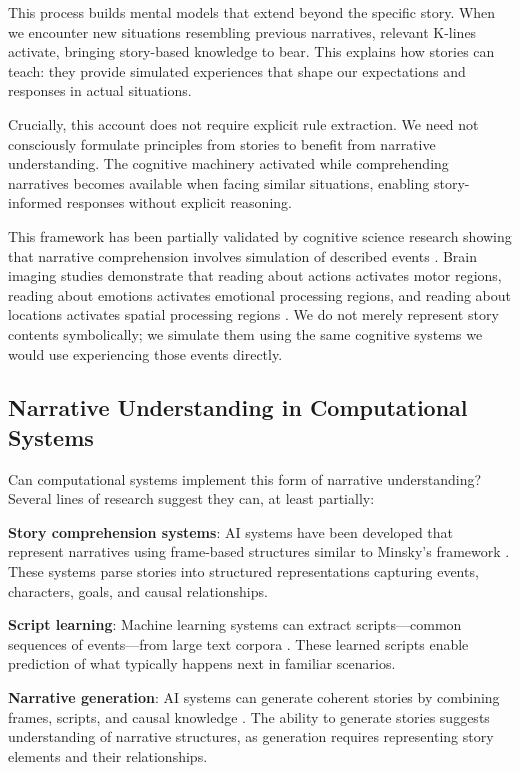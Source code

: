 \documentclass[12pt]{article}
\begin{document}
This process builds mental models that extend beyond the specific story. When we encounter new situations resembling previous narratives, relevant K-lines activate, bringing story-based knowledge to bear. This explains how stories can teach: they provide simulated experiences that shape our expectations and responses in actual situations.

Crucially, this account does not require explicit rule extraction. We need not consciously formulate principles from stories to benefit from narrative understanding. The cognitive machinery activated while comprehending narratives becomes available when facing similar situations, enabling story-informed responses without explicit reasoning.

This framework has been partially validated by cognitive science research showing that narrative comprehension involves simulation of described events \citep{zwaan2004constructionist, speer2009reading}. Brain imaging studies demonstrate that reading about actions activates motor regions, reading about emotions activates emotional processing regions, and reading about locations activates spatial processing regions \citep{hasson2004intersubject}. We do not merely represent story contents symbolically; we simulate them using the same cognitive systems we would use experiencing those events directly.

\subsection{Narrative Understanding in Computational Systems}

Can computational systems implement this form of narrative understanding? Several lines of research suggest they can, at least partially:

\textbf{Story comprehension systems}: AI systems have been developed that represent narratives using frame-based structures similar to Minsky's framework \citep{mueller2003story, reagan2016emotional}. These systems parse stories into structured representations capturing events, characters, goals, and causal relationships.

\textbf{Script learning}: Machine learning systems can extract scripts—common sequences of events—from large text corpora \citep{chambers2008unsupervised, regneri2010learning}. These learned scripts enable prediction of what typically happens next in familiar scenarios.

\textbf{Narrative generation}: AI systems can generate coherent stories by combining frames, scripts, and causal knowledge \citep{riedl2010narrative, li2013story}. The ability to generate stories suggests understanding of narrative structures, as generation requires representing story elements and their relationships.
\end{document}
